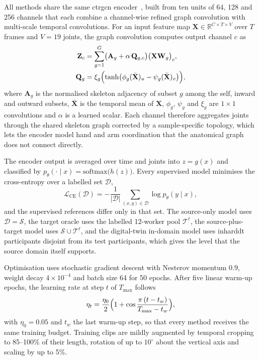 \documentclass[Afour,sagev,times]{sagej}
\begin{document}
All methods share the same \ac{ctrgcn} encoder~\cite{chen2021ctrgcn}, built
from ten units of 64, 128 and 256 channels that each combine a channel-wise
refined graph convolution with multi-scale temporal convolutions. For an input
feature map $\mathbf{X}\in\mathbb{R}^{C\times T\times V}$ over $T$ frames and
$V=19$ joints, the graph convolution computes output channel $c$ as
\begin{equation}
  \begin{aligned}
  \mathbf{Z}_c
    &=\sum_{g=1}^{G}\bigl(\mathbf{A}_g+\alpha\,\mathbf{Q}_{g,c}\bigr)
      \bigl(\mathbf{X}\mathbf{W}_g\bigr)_c,\\
  \mathbf{Q}_{g}
    &=\xi_g\Bigl(\tanh\bigl(\phi_g(\bar{\mathbf{X}})_u
      -\psi_g(\bar{\mathbf{X}})_v\bigr)\Bigr),
  \end{aligned}
  \label{eq:ctrgc}
\end{equation}
where $\mathbf{A}_g$ is the normalised skeleton adjacency of subset $g$ among
the self, inward and outward subsets, $\bar{\mathbf{X}}$ is the temporal mean
of $\mathbf{X}$, $\phi_g$, $\psi_g$ and $\xi_g$ are $1\times1$ convolutions and
$\alpha$ is a learned scalar. Each channel therefore aggregates joints through
the shared skeleton graph corrected by a sample-specific topology, which lets
the encoder model hand and arm coordination that the anatomical graph does not
connect directly.

The encoder output is averaged over time and joints into $z=g(x)$ and
classified by $p_\theta(\cdot\mid x)=\mathrm{softmax}\bigl(h(z)\bigr)$. Every
supervised model minimises the cross-entropy over a labelled set $\mathcal{D}$,
\begin{equation}
  \mathcal{L}_{\mathrm{CE}}(\mathcal{D})=-\frac{1}{|\mathcal{D}|}
  \sum_{(x,y)\in\mathcal{D}}\log p_\theta(y\mid x),
  \label{eq:ce}
\end{equation}
and the supervised references differ only in that set. The source-only model
uses $\mathcal{D}=\mathcal{S}$, the target oracle uses the labelled 12-worker
pool $\mathcal{T}^{\ell}$, the source-plus-target model uses
$\mathcal{S}\cup\mathcal{T}^{\ell}$, and the digital-twin in-domain model uses
\acs{inharddt} participants disjoint from its test participants, which gives
the level that the source domain itself supports.

Optimisation uses stochastic gradient descent with Nesterov momentum $0.9$,
weight decay $4\times10^{-4}$ and batch size 64 for 50 epochs. After five
linear warm-up epochs, the learning rate at step $t$ of $T_{\max}$ follows
\begin{equation}
  \eta_t=\frac{\eta_0}{2}\Bigl(1+\cos\frac{\pi\,(t-t_w)}{T_{\max}-t_w}\Bigr),
  \label{eq:lr}
\end{equation}
with $\eta_0=0.05$ and $t_w$ the last warm-up step, so that every method
receives the same training budget. Training clips are mildly augmented by
temporal cropping to 85--100\% of their length, rotation of up to $10^\circ$
about the vertical axis and scaling by up to 5\%.
\end{document}
